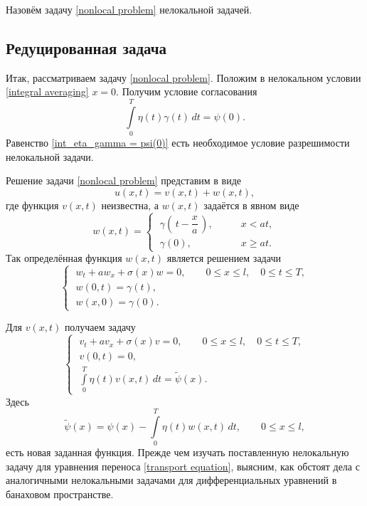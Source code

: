 \documentclass{article}
\renewcommand{\le}{\leqslant}
\renewcommand{\ge}{\geqslant}
\theoremstyle{definition}
\begin{document}
Назовём задачу \eqref{nonlocal problem} нелокальной задачей.

\subsection{Редуцированная задача}

Итак, рассматриваем задачу \eqref{nonlocal problem}. Положим в нелокальном условии \eqref{integral averaging} \linebreak $x = 0$. 
Получим условие согласования
\begin{equation} \label{int_eta_gamma = psi(0)}
	\int\limits_{0}^{T} \eta(t) \gamma(t)\,dt = \psi(0).
\end{equation}
Равенство \eqref{int_eta_gamma = psi(0)} есть необходимое условие разрешимости нелокальной задачи.

Решение задачи \eqref{nonlocal problem} представим в виде
\begin{equation*}
	u(x,t) = v(x,t) + w(x,t),
\end{equation*}
где функция $v(x,t)$ неизвестна, а $w(x,t)$ задаётся в явном виде
\begin{equation} \label{w(x,t)}
w(x,t) = 
	\begin{cases}
	\; \gamma\left(\,t - \dfrac{x}{a}\,\right), & \qquad x < at, \\[3mm]
	\; \gamma(0), & \qquad x \ge at.
	\end{cases}
\end{equation}
Так определённая функция $w(x,t)$ является решением задачи
\begin{equation*}
\begin{cases}
	\; w_t + aw_x + \sigma(x)w = 0, \qquad 0 \le x \le l, \quad 0 \le t \le T, \\[1mm]
	\; w(0,t) = \gamma(t), \\[1mm]
	\; w(x,0) = \gamma(0).
\end{cases}
\end{equation*}

Для $v(x,t)$ получаем задачу
\begin{equation*}
\begin{cases}
	\; v_t + av_x + \sigma(x)v = 0, \qquad 0 \le x \le l, \quad 0 \le t \le T, \\[3mm]
	\; v(0,t) = 0, \\[1mm]
	\; \int\limits_{0}^{T} \eta(t) v(x,t)\,dt = \widetilde{\psi}(x).
\end{cases}
\end{equation*}
Здесь 
\begin{equation*}
	\widetilde{\psi}(x) = \psi(x) - \int\limits_{0}^{T} \eta(t) w(x,t)\,dt, \qquad 0 \le x \le l,
\end{equation*}
есть новая заданная функция.
\goodbreak
Прежде чем изучать поставленную нелокальную задачу для уравнения переноса \eqref{transport equation},
выясним, как обстоят дела с аналогичными нелокальными задачами для дифференциальных уравнений в банаховом пространстве.
\end{document}

